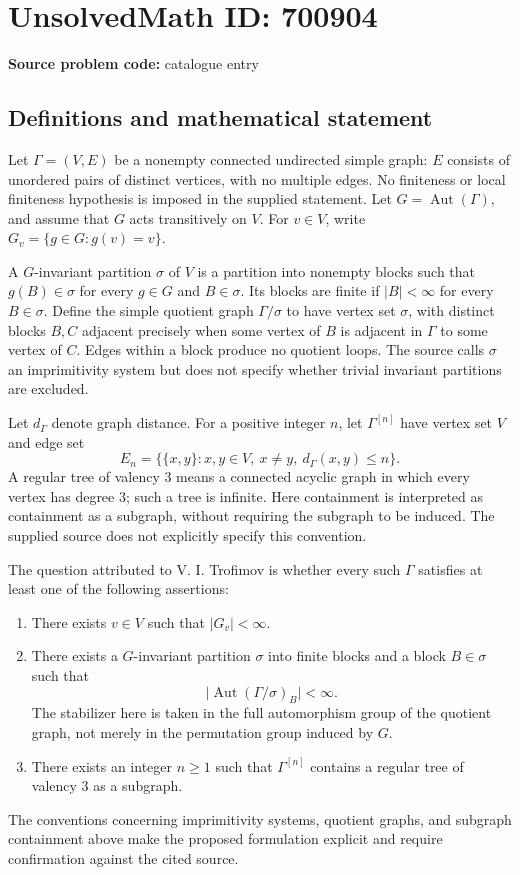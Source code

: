 \documentclass[11pt]{article}
\begin{document}
\section*{UnsolvedMath ID: 700904}
\textbf{Source problem code:} catalogue entry
\subsection{Definitions and mathematical statement}
Let \(\Gamma=(V,E)\) be a nonempty connected undirected simple graph: \(E\) consists of unordered pairs of distinct vertices, with no multiple edges. No finiteness or local finiteness hypothesis is imposed in the supplied statement. Let \(G=\operatorname{Aut}(\Gamma)\), and assume that \(G\) acts transitively on \(V\). For \(v\in V\), write \(G_v=\{g\in G:g(v)=v\}\).

A \(G\)-invariant partition \(\sigma\) of \(V\) is a partition into nonempty blocks such that \(g(B)\in\sigma\) for every \(g\in G\) and \(B\in\sigma\). Its blocks are finite if \(|B|<\infty\) for every \(B\in\sigma\). Define the simple quotient graph \(\Gamma/\sigma\) to have vertex set \(\sigma\), with distinct blocks \(B,C\) adjacent precisely when some vertex of \(B\) is adjacent in \(\Gamma\) to some vertex of \(C\). Edges within a block produce no quotient loops. The source calls \(\sigma\) an imprimitivity system but does not specify whether trivial invariant partitions are excluded.

Let \(d_\Gamma\) denote graph distance. For a positive integer \(n\), let \(\Gamma^{[n]}\) have vertex set \(V\) and edge set
\[
E_n=\bigl\{\{x,y\}:x,y\in V,\ x\ne y,\ d_\Gamma(x,y)\le n\bigr\}.
\]
A regular tree of valency \(3\) means a connected acyclic graph in which every vertex has degree \(3\); such a tree is infinite. Here containment is interpreted as containment as a subgraph, without requiring the subgraph to be induced. The supplied source does not explicitly specify this convention.

The question attributed to V. I. Trofimov is whether every such \(\Gamma\) satisfies at least one of the following assertions:
\begin{enumerate}
\item There exists \(v\in V\) such that \(|G_v|<\infty\).
\item There exists a \(G\)-invariant partition \(\sigma\) into finite blocks and a block \(B\in\sigma\) such that
\[
\bigl|\operatorname{Aut}(\Gamma/\sigma)_B\bigr|<\infty.
\]
The stabilizer here is taken in the full automorphism group of the quotient graph, not merely in the permutation group induced by \(G\).
\item There exists an integer \(n\ge1\) such that \(\Gamma^{[n]}\) contains a regular tree of valency \(3\) as a subgraph.
\end{enumerate}
The conventions concerning imprimitivity systems, quotient graphs, and subgraph containment above make the proposed formulation explicit and require confirmation against the cited source.
\end{document}
